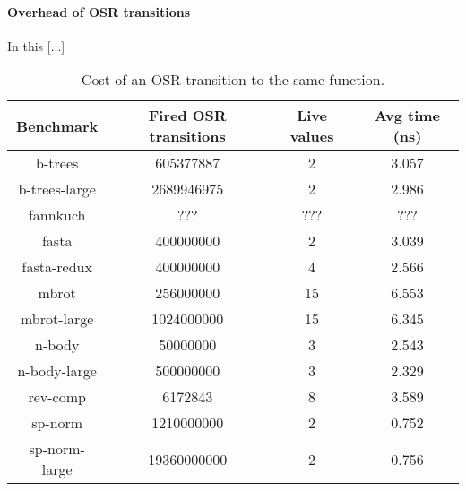 \paragraph{Overhead of OSR transitions}

In this [...]

\begin{table} 
    \begin{tabular}{ |c|c|c|c| }
        \hline
        Benchmark & Fired OSR transitions & Live values & Avg time (ns) \\ 
        \hline
        \hline
        b-trees & 605377887 & 2 & 3.057 \\ 
        \hline
        b-trees-large & 2689946975 & 2 & 2.986 \\ 
        \hline
        fannkuch & ??? & ??? & ??? \\ 
        \hline
        fasta & 400000000 & 2 & 3.039 \\ 
        \hline
        fasta-redux & 400000000 & 4 & 2.566 \\ 
        \hline
        mbrot & 256000000 & 15 & 6.553 \\ 
        \hline
        mbrot-large & 1024000000 & 15 & 6.345 \\ 
        \hline
        n-body & 50000000 & 3 & 2.543 \\ 
        \hline
        n-body-large & 500000000 & 3 & 2.329 \\ 
        \hline
        rev-comp & 6172843 & 8 & 3.589 \\ 
        \hline
        sp-norm & 1210000000 & 2 & 0.752 \\ 
        \hline
        sp-norm-large & 19360000000 & 2 & 0.756 \\
        \hline
    \end{tabular} 
    \caption{\label{tab:sameFun} Cost of an OSR transition to the same function.} 
\end{table}
  
  